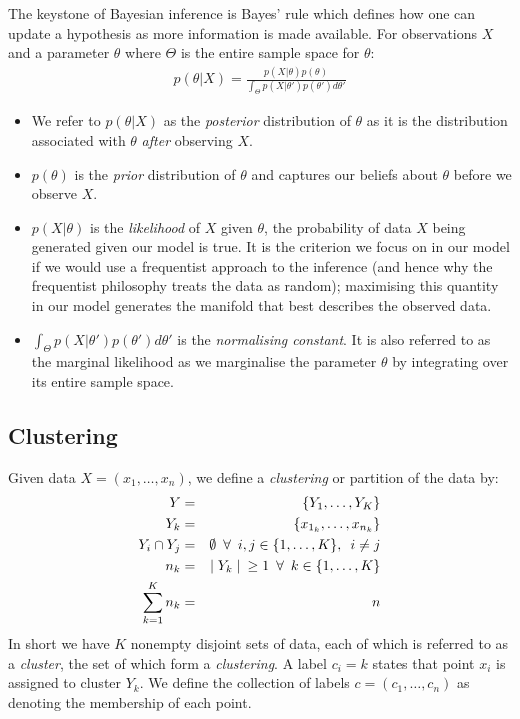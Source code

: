 \documentclass[12pt]{article} %
\begin{document}
	The keystone of Bayesian inference is Bayes' rule which defines how one can update a hypothesis as more information is made available. For observations $X$ and a parameter $\theta$ where $\Theta$ is the entire sample space for $\theta$:
	\begin{align} \label{Bayes_theorem}
	p(\theta | X) = \frac{p(X | \theta) p(\theta)}{\int_\Theta p(X | \theta ') p(\theta ') d \theta '}
	\end{align}
	\begin{itemize}
		\item We refer to $p(\theta | X)$ as the \emph{posterior} distribution of $\theta$ as it is the distribution associated with $\theta$ \emph{after} observing $X$.
		\item $p(\theta)$ is the \emph{prior} distribution of $\theta$ and captures our beliefs about $\theta$ before we observe $X$.
		\item $p(X | \theta)$ is the \emph{likelihood} of $X$ given $\theta$, the probability of data $X$ being generated given our model is true. It is the criterion we focus on in our model if we would use a frequentist approach to the inference (and hence why the frequentist philosophy treats the data as random); maximising this quantity in our model generates the manifold that best describes the observed data. 
		\item $\int_\Theta p(X | \theta ') p(\theta ') d \theta '$ is the \emph{normalising constant}. It is also referred to as the marginal likelihood as we marginalise the parameter $\theta$ by integrating over its entire sample space.
	\end{itemize}
	
	\subsection{Clustering} \label{sec:clustering}
	Given data $X=\left(x_1,\ldots,x_n\right)$, we define a \emph{clustering} or partition of the data by:
	\begin{eqnarray}
	Y &=& \left\{Y_1,\ldots,Y_K\right\} \\
	Y_k &=& \left\{x_{1_k},\ldots, x_{n_k}\right\}  \\
	Y_i \cap Y_j &=& \emptyset \enskip \forall \enskip i,j \in \{1,\ldots,K\}, \enskip i \neq j \\
	n_k & = & \mid Y_k \mid \enskip \geq 1 \enskip \forall \enskip k \in \{1,\ldots,K\} \\
	\sum_{k=1}^Kn_k &=& n
	\end{eqnarray}
	In short we have $K$ nonempty disjoint sets of data, each of which is referred to as a \emph{cluster}, the set of which form a \emph{clustering}. A label $c_i=k$ states that point $x_i$ is assigned to cluster $Y_k$. We define the collection of labels $c=(c_1,\ldots,c_n)$ as denoting the membership of each point.
	
\end{document}
